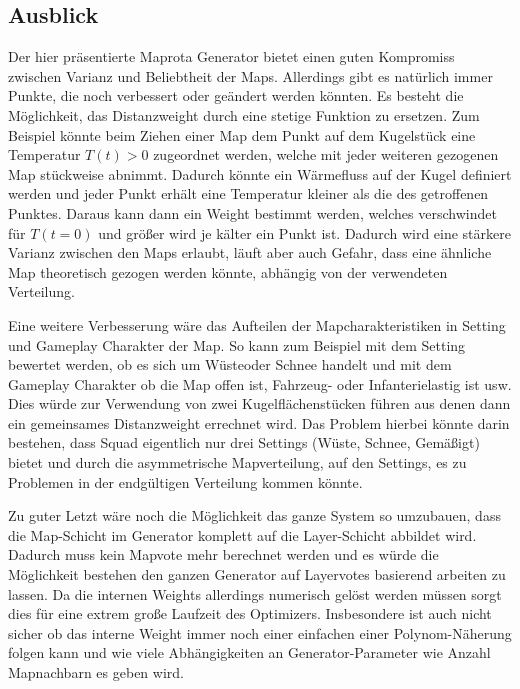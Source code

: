     \subsection{Ausblick}
        Der hier präsentierte Maprota Generator bietet einen guten Kompromiss zwischen Varianz und Beliebtheit der Maps. 
        Allerdings gibt es natürlich immer Punkte, die noch verbessert oder geändert werden könnten.
        Es besteht die Möglichkeit, das Distanzweight durch eine stetige Funktion zu ersetzen. 
        Zum Beispiel könnte beim Ziehen einer Map dem Punkt auf dem Kugelstück eine Temperatur $T(t)>0$ zugeordnet werden,
        welche mit jeder weiteren gezogenen Map stückweise abnimmt.
        Dadurch könnte ein Wärmefluss auf der Kugel definiert werden und jeder Punkt erhält eine Temperatur kleiner als die des getroffenen Punktes. 
        Daraus kann dann ein Weight bestimmt werden, 
        welches verschwindet für $T(t=0)$ und größer wird je \glqq{}kälter\grqq{} ein Punkt ist. 
        Dadurch wird eine stärkere Varianz zwischen den Maps erlaubt, 
        läuft aber auch Gefahr, dass eine ähnliche Map theoretisch gezogen werden könnte, abhängig von der verwendeten Verteilung.
        
        Eine weitere Verbesserung wäre das Aufteilen der Mapcharakteristiken in \glqq{}Setting\grqq{} und \glqq{}Gameplay\grqq{} Charakter der Map. 
        So kann zum Beispiel mit dem Setting bewertet werden, ob es sich um \glqq{}Wüste\grqq{}oder \glqq{}Schnee\grqq{} handelt 
        und mit dem Gameplay Charakter ob die Map offen ist, Fahrzeug- oder Infanterielastig ist usw. 
        Dies würde zur Verwendung von zwei Kugelflächenstücken führen aus denen dann ein gemeinsames Distanzweight errechnet wird. 
        Das Problem hierbei könnte darin bestehen, dass Squad eigentlich nur drei Settings (\glqq{}Wüste\grqq{}, \glqq{}Schnee\grqq{}, \glqq{}Gemäßigt\grqq{}) 
        bietet und durch die asymmetrische Mapverteilung, auf den Settings, es zu Problemen in der endgültigen Verteilung kommen könnte.

        Zu guter Letzt wäre noch die Möglichkeit das ganze System so umzubauen, dass die Map-Schicht im Generator komplett auf die Layer-Schicht abbildet wird.
        Dadurch muss kein Mapvote mehr berechnet werden und es würde die Möglichkeit bestehen den ganzen Generator auf Layervotes basierend arbeiten zu lassen.
        Da die internen Weights allerdings numerisch gelöst werden müssen sorgt dies für eine extrem große Laufzeit des Optimizers.
        Insbesondere ist auch nicht sicher ob das interne Weight immer noch einer 
        einfachen einer Polynom-Näherung folgen kann und wie viele Abhängigkeiten an Generator-Parameter wie \glqq{}Anzahl Mapnachbarn\grqq{} es geben wird. 